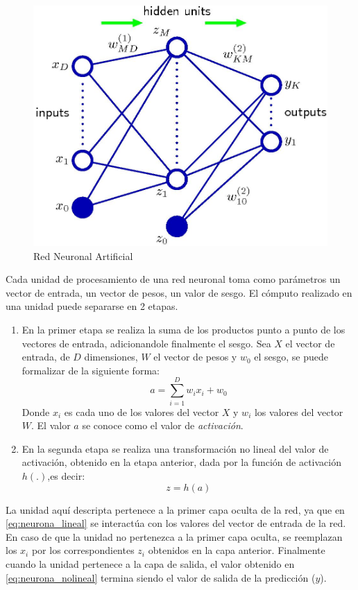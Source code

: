 \documentclass[a4paper,11pt,spanish]{book}
\begin{document}
	\begin{figure}[ht]
	  \begin{center}
	    \includegraphics[width=0.8\linewidth]{./img/bishop_neural_network.jpg}
	  \end{center}
	  \caption{Red Neuronal Artificial}
	  \label{fig:neural_network}
	\end{figure}

	Cada unidad de procesamiento de una red neuronal toma como parámetros un vector de entrada, un vector de pesos, un valor de sesgo. 
	El cómputo realizado en una unidad puede separarse en 2 etapas.
	\begin{enumerate}
	  \item En la primer etapa se realiza la suma de los productos punto a punto de los vectores de entrada, adicionandole finalmente el sesgo.
	    Sea $X$ el vector de entrada, de $D$ dimensiones, $W$ el vector de pesos y $w_0$ el sesgo, se puede formalizar de la siguiente forma:
	    \begin{equation} \label{eq:neurona_lineal}
	      a = \sum_{i=1}^{D} w_{i} x_i + w_{0}
	    \end{equation}
	    Donde $x_i$ es cada uno de los valores del vector $X$ y $w_{i}$ los valores del vector $W$. El valor $a$ se conoce como el valor de \emph{activación}.
	  \item En la segunda etapa se realiza una transformación no lineal del valor de activación, obtenido en la etapa anterior, dada por la función de activación $h(.)$,es decir:
	    \begin{equation}\label{eq:neurona_nolineal}
	      z = h(a)
	    \end{equation}
	\end{enumerate}
	La unidad aquí descripta pertenece a la primer capa oculta de la red, ya que en \eqref{eq:neurona_lineal} se interactúa	con los valores del vector de entrada 
	de la red. 
	En caso de que la unidad no pertenezca a la primer capa oculta, se reemplazan los $x_i$ por los correspondientes $z_i$ obtenidos en la capa anterior. 
	Finalmente cuando la unidad pertenece a la capa de salida, el valor obtenido en \eqref{eq:neurona_nolineal} termina siendo el valor de salida de la predicción ($y$).
	
\end{document}
